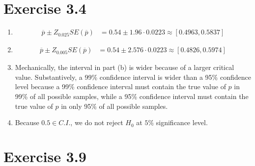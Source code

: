 \documentclass[
]{book}
\begin{document}
\hypertarget{exercise-3.4}{%
\section{Exercise 3.4}\label{exercise-3.4}}

\begin{enumerate}
\def\labelenumi{\alph{enumi}.}
\item
  \begin{align}
        \overline{p} \pm Z_{0.025}SE\left( \overline{p} \right) 
        & = 0.54 \pm 1.96\cdot 0.0223
          \approx [0.4963,0.5837]
    \end{align}
\item
  \begin{align}
        \overline{p} \pm Z_{0.005}SE\left( \overline{p} \right) 
        & = 0.54 \pm 2.576\cdot 0.0223
          \approx [0.4826,0.5974]
    \end{align}
\item
  Mechanically, the interval in part (b) is wider because of a larger critical value. Substantively, a 99\% confidence interval is wider than a 95\% confidence level because a 99\% confidence interval must contain the true value of \(p\) in 99\% of all possible samples, while a 95\% confidence interval must contain the true value of \(p\) in only 95\% of all possible samples.
\item
  Because \(0.5\in C.I.\), we do not reject \(H_0\) at \(5\%\) significance level.
\end{enumerate}

\hypertarget{exercise-3.9}{%
\section{Exercise 3.9}\label{exercise-3.9}}
\end{document}
